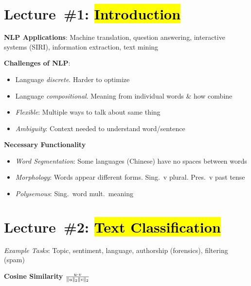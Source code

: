 \documentclass[9pt]{extarticle}
\renewcommand{\green}[1]{{\color{ForestGreen} #1}}
\newcommand{\greenbf}[1]{\textbf{\green{#1}}}
\begin{document}
\setlength{\abovedisplayskip}{0pt}
\setlength{\belowdisplayskip}{0pt}
\setlength{\abovedisplayshortskip}{0pt}
\setlength{\belowdisplayshortskip}{0pt}

\begin{multicols}{3}
  \section*{Lecture~\#1: \hl{Introduction}}

  \textbf{NLP Applications}: Machine translation, question answering, interactive systems (SIRI), information extraction, text mining

  \textbf{Challenges of NLP}:
  \begin{itemize}
    \item Language \textit{discrete}. Harder to optimize
    \item Language \textit{compositional}. Meaning from individual words \& how combine
    \item \textit{Flexible}: Multiple ways to talk about same thing
    \item \textit{Ambiguity}: Context needed to understand word/sentence
  \end{itemize}

  \textbf{Necessary Functionality}
  \begin{itemize}
    \item \textit{Word Segmentation}: Some languages (Chinese) have no spaces between words
    \item \textit{Morphology}: Words appear different forms. Sing.\ v plural. Pres.\ v past tense
    \item \textit{Polysemous}: Sing.\ word mult.\ meaning
  \end{itemize}

  \section*{Lecture~\#2: \hl{Text Classification}}
  \textit{Example Tasks}: Topic, sentiment, language, authorship (forensics), filtering (spam)

  \greenbf{Cosine Similarity} $\frac{u \cdot v}{\lVert u\rVert_{2} \lVert v\rVert_{2}}$

  \subsection*{}


\end{multicols}
\end{document}
